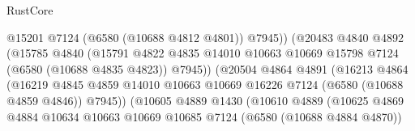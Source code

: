 \begin{lexlean}{RustCore}
\begin{coremodule}
                                            @15201
                                            @7124
                                            (@6580 (@10688 @4812 @4801))
                                            @7945))
                                        (@20483
                                          @4840
                                          @4892
                                          (@15785
                                            @4840
                                            (@15791
                                              @4822
                                              @4835
                                              @14010
                                              @10663
                                              @10669
                                              @15798
                                              @7124
                                              (@6580 (@10688 @4835 @4823))
                                              @7945))
                                          (@20504
                                            @4864
                                            @4891
                                            (@16213
                                              @4864
                                              (@16219
                                                @4845
                                                @4859
                                                @14010
                                                @10663
                                                @10669
                                                @16226
                                                @7124
                                                (@6580 (@10688 @4859 @4846))
                                                @7945))
                                            (@10605
                                              @4889
                                              @1430
                                              (@10610
                                                @4889
                                                (@10625
                                                  @4869
                                                  @4884
                                                  @10634
                                                  @10663
                                                  @10669
                                                  @10685
                                                  @7124
                                                  (@6580 (@10688 @4884 @4870))

\end{coremodule}
\end{lexlean}
